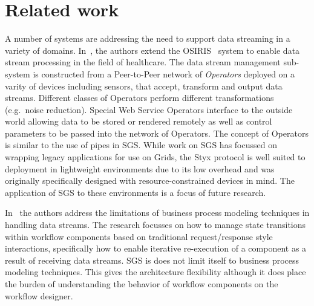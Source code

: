 \documentclass[a4paper]{article}
\begin{document}
\section{Related work}\label{sec:related}

A number of systems are addressing the need to support data streaming in a variety of domains. In~\cite{brettlecker:2004}, the authors extend the OSIRIS~\cite{schuler:2003} system to enable data stream processing in the field of healthcare. The data stream management sub-system is constructed from a Peer-to-Peer network of \emph{Operators} deployed on a varity of devices including sensors, that accept, transform and output data streams. Different classes of Operators perform different transformations (e.g.\ noise reduction). Special Web Service Operators interface to the outside world allowing data to be stored or rendered remotely as well as control parameters to be passed into the network of Operators. The concept of Operators is similar to the use of pipes in SGS. While work on SGS has focussed on wrapping legacy applications for use on Grids, the Styx protocol is well suited to deployment in lightweight environments due to its low overhead and was originally specifically designed with resource-constrained devices in mind. The application of SGS to these environments is a focus of future research.

In~\cite{bioernstad:2006} the authors address the limitations of business process modeling techniques in handling data streams. The research focusses on how to manage state transitions within workflow components based on traditional request/response style interactions, specifically how to enable iterative re-execution of a component as a result of receiving data streams. SGS is does not limit itself to business process modeling techniques. This gives the architecture flexibility although it does place the burden of understanding the behavior of workflow components on the workflow designer.
\end{document}
